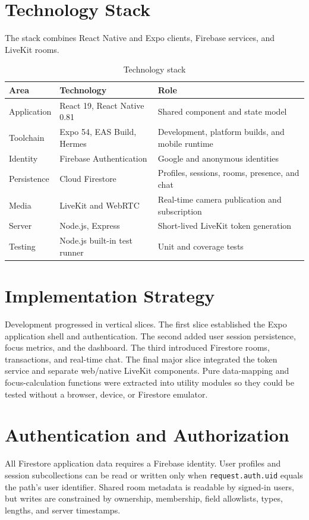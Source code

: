 \section{Technology Stack}
The stack combines React Native and Expo clients, Firebase services, and LiveKit rooms.
\begin{table}[H]
\centering
\begin{tabularx}{\textwidth}{|p{}|p{}|X|}
\hline
\textbf{Area} & \textbf{Technology} & \textbf{Role} \\ \hline
Application & React 19, React Native 0.81 & Shared component and state model \\ \hline
Toolchain & Expo 54, EAS Build, Hermes & Development, platform builds, and mobile runtime \\ \hline
Identity & Firebase Authentication & Google and anonymous identities \\ \hline
Persistence & Cloud Firestore & Profiles, sessions, rooms, presence, and chat \\ \hline
Media & LiveKit and WebRTC & Real-time camera publication and subscription \\ \hline
Server & Node.js, Express & Short-lived LiveKit token generation \\ \hline
Testing & Node.js built-in test runner & Unit and coverage tests \\ \hline
\end{tabularx}
\caption{Technology stack}
\label{tab:stack}
\end{table}

\section{Implementation Strategy}
Development progressed in vertical slices. The first slice established the Expo application shell and authentication. The second added user session persistence, focus metrics, and the dashboard. The third introduced Firestore rooms, transactions, and real-time chat. The final major slice integrated the token service and separate web/native LiveKit components. Pure data-mapping and focus-calculation functions were extracted into utility modules so they could be tested without a browser, device, or Firestore emulator.

\section{Authentication and Authorization}
All Firestore application data requires a Firebase identity. User profiles and session subcollections can be read or written only when \texttt{request.auth.uid} equals the path's user identifier. Shared room metadata is readable by signed-in users, but writes are constrained by ownership, membership, field allowlists, types, lengths, and server timestamps.

